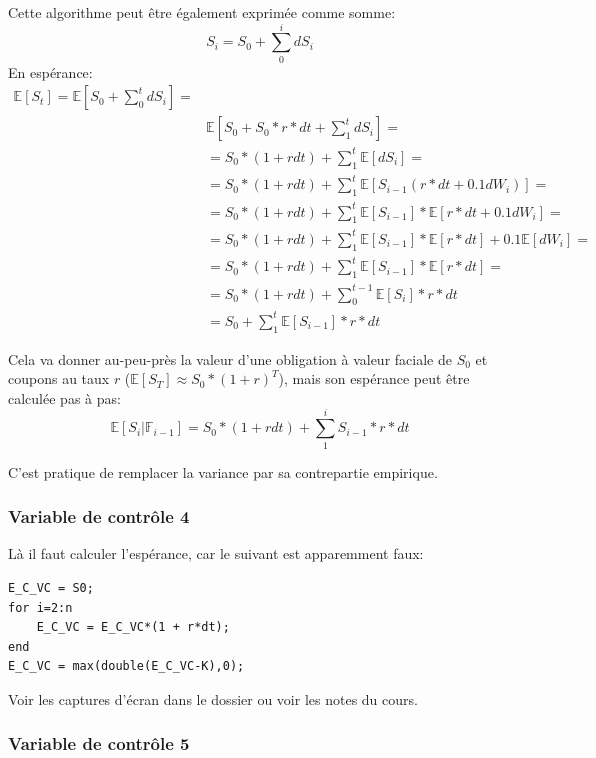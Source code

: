 \documentclass[a4paper,12pt]{scrartcl}
\begin{document}
Cette algorithme peut être également exprimée comme somme:
$$S_i = S_0 + \sum_0^i dS_i$$
En espérance:
\begin{align*}
\mathbb{E}[S_t] = 
\mathbb{E}[S_0 + \sum_0^t dS_i] =  \\
&\mathbb{E}[S_0 + S_0*r*dt +\sum_1^t dS_i] = \\ 
&= S_0*(1+rdt) + \sum_1^t \mathbb{E}[dS_i] = \\
&= S_0*(1+rdt) + \sum_1^t \mathbb{E}[S_{i-1}(r*dt + 0.1dW_{i})] = \\
&= S_0*(1+rdt) + \sum_1^t \mathbb{E}[S_{i-1}]*\mathbb{E}[r*dt + 0.1dW_{i}] = \\
&= S_0*(1+rdt) + \sum_1^t \mathbb{E}[S_{i-1}]*\mathbb{E}[r*dt] + 
                 0.1\mathbb{E}[dW_{i}] = \\
&= S_0*(1+rdt) + \sum_1^t \mathbb{E}[S_{i-1}]*\mathbb{E}[r*dt] = \\
&= S_0*(1+rdt) + \sum_0^{t-1} \mathbb{E}[S_{i}]*r*dt \\
&= S_0 + \sum_1^t \mathbb{E}[S_{i-1}]*r*dt
\end{align*}

Cela va donner au-peu-près la valeur d'une obligation à valeur faciale de $S_0$ et coupons au taux $r$ 
($\mathbb{E}[S_{T}] \approx S_0*(1+r)^T$), 
mais son espérance peut être calculée pas à pas:
$$\mathbb{E}[S_i | \mathbb{F}_{i-1}] = S_0*(1+rdt) + \sum_1^i S_{i-1}*r*dt $$

C'est pratique de remplacer la variance par sa contrepartie empirique. 

\subsubsection{Variable de contrôle 4}


Là il faut calculer l'espérance, car le suivant est apparemment faux:

\begin{lstlisting}
E_C_VC = S0;
for i=2:n
    E_C_VC = E_C_VC*(1 + r*dt);
end
E_C_VC = max(double(E_C_VC-K),0);
\end{lstlisting}

Voir les captures d'écran dans le dossier ou voir les notes du cours.

\subsubsection{Variable de contrôle 5}
\end{document}
